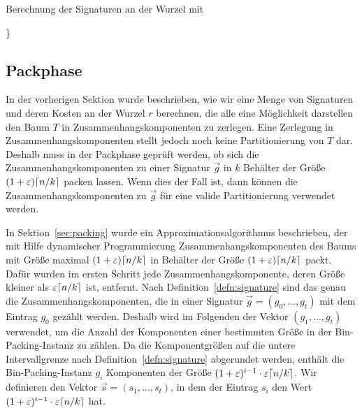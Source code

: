 \begin{algorithm}
    \caption{Berechnung der Signaturen an der Wurzel mit \carfun{}}\label{alg:carfun}
    \begin{algorithmic}[1]
                    \}
                \EndFor
           \EndFor
        \EndFunction
    \end{algorithmic}
\end{algorithm}


\subsection{Packphase}\label{sec:packingimpl}
In der vorherigen Sektion wurde beschrieben, wie wir eine Menge von Signaturen und deren Kosten an der Wurzel $r$ berechnen, die alle eine Möglichkeit darstellen den Baum $T$ in Zusammenhangskomponenten zu zerlegen.
Eine Zerlegung in Zusammenhangskomponenten stellt jedoch noch keine Partitionierung von $T$ dar.
Deshalb muss in der Packphase geprüft werden, ob sich die Zusammenhangskomponenten zu einer Signatur $\vec{g}$ in $k$ Behälter der Größe $(1+\varepsilon)\lceil n/k\rceil$ packen lassen.
Wenn dies der Fall ist, dann können die Zusammenhangskomponenten zu $\vec{g}$ für eine valide Partitionierung verwendet werden.

In Sektion~\ref{sec:packing} wurde ein Approximationsalgorithmus beschrieben, der mit Hilfe dynamischer Programmierung Zusammenhangskomponenten des Baums mit Größe maximal $(1+\varepsilon)\lceil n/k\rceil$ in Behälter der Größe $(1+\varepsilon)\lceil n/k\rceil$ packt.
Dafür wurden im ersten Schritt jede Zusammenhangskomponente, deren Größe kleiner als $\varepsilon \lceil n/k\rceil$ ist, entfernt.
Nach Definition~\ref{defn:signature} sind das genau die Zusammenhangskomponenten, die in einer Signatur $\vec{g} = (g_0, \ldots, g_t)$ mit dem Eintrag $g_0$ gezählt werden.
Deshalb wird im Folgenden der Vektor $(g_1, \ldots, g_t)$ verwendet, um die Anzahl der Komponenten einer bestimmten Größe in der Bin-Packing-Instanz zu zählen.
Da die Komponentgrößen auf die untere Intervallgrenze nach Definition~\ref{defn:signature} abgerundet werden, enthält die Bin-Packing-Instanz $g_i$ Komponenten der Größe $(1+\varepsilon)^{i-1} \cdot \varepsilon \lceil n/k\rceil$.
Wir definieren den Vektor $\vec{s} = (s_1, \ldots, s_t)$, in dem der Eintrag $s_i$ den Wert $(1+\varepsilon)^{i-1} \cdot \varepsilon \lceil n/k\rceil$ hat.

